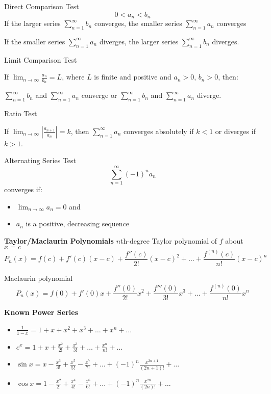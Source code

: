 \documentclass[10pt,a4paper,oneside]{book}
\begin{document}
Direct Comparison Test 
\[ 0<a_n<b_n \]
If the larger series $\sum_{n=1}^\infty b_n$ converges, the smaller series $\sum_{n=1}^\infty a_n$ converges 

If the smaller series $\sum_{n=1}^\infty a_n$ diverges, the larger series $\sum_{n=1}^\infty b_n$ diverges.

Limit Comparison Test 

If $\lim_{n\to \infty} \frac{a_n}{b_n}=L$, where $L$ is finite and positive and $a_n>0$, $b_n>0$, then: 

$\sum_{n=1}^\infty b_n$ and $\sum_{n=1}^\infty a_n$ converge or $\sum_{n=1}^\infty b_n$ and $\sum_{n=1}^\infty a_n$ diverge.

Ratio Test 

If $\lim_{n\to\infty}\left|\frac{a_{n+1}}{a_n}\right| = k$, then $\sum_{n=1}^\infty a_n$ converges absolutely if $k<1$ or diverges if $k>1$.

Alternating Series Test 
\[ \sum_{n=1}^\infty (-1)^na_n \]
converges if:
\begin{itemize}
    \item $\lim_{n\to\infty}a_n = 0$ and 
    \item $a_n$ is a positive, decreasing sequence 
\end{itemize}

\textbf{Taylor/Maclaurin Polynomials}
$n$th-degree Taylor polynomial of $f$ about $x=c$
\[ P_n(x)=f(c)+f'(c)(x-c)+\frac{f''(c)}{2!}(x-c)^2+\dots + \frac{f^(n)(c)}{n!}(x-c)^n \]

Maclaurin polynomial 
\[ P_n(x)=f(0)+f'(0)x+\frac{f''(0)}{2!}x^2+\frac{f'''(0)}{3!}x^3+\dots + \frac{f^{(n)}(0)}{n!}x^n \]

\textbf{Known Power Series}
\begin{itemize}
    \item $\frac{1}{1-x}=1+x+x^2+x^3+\dots+x^n+\dots$
    \item $e^x = 1+x+\frac{x^2}{2!}+\frac{x^3}{3!}+\dots+\frac{x^n}{n!}+\dots$
    \item $\sin x = x-\frac{x^3}{3!}+\frac{x^5}{5!}-\frac{x^7}{7!}+\dots+(-1)^n\frac{x^{2n+1}}{(2n+1)!}+\dots$
    \item $\cos x = 1-\frac{x^2}{2!}+\frac{x^4}{4!}-\frac{x^6}{6!}+\dots+(-1)^n\frac{x^{2n}}{(2n)!}+\dots$
\end{itemize}
\end{document}
